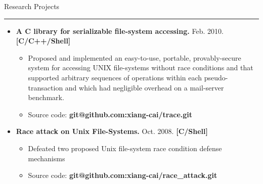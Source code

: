 \documentclass[11pt,oneside]{article}
\newenvironment{ressection}[1]{
	{\fontfamily{phv}\selectfont\Large#1}
	
	\vspace{-8pt} \rule{\textwidth}{.5pt}
	
	\vspace{-4pt}
	\begin{itemize}
	\vspace{.5pt}
}{
	\end{itemize}
}
\newcommand{\resitem}[1]{
	\vspace{2pt}
	\item \begin{flushleft} #1 \end{flushleft}
}
\begin{document}
\begin{ressection}{Research Projects}
	\vspace{-4pt}
	\resitem{\textbf{A C library for serializable file-system
				accessing.} Feb. 2010. \hfill\textbf{[C/C++/Shell]} 
		\vspace{-2pt}
		\begin{small}
		\vspace{-2pt}
		\begin{itemize}
		\item
		Proposed and implemented an
					easy-to-use, portable, provably-secure system for
					accessing UNIX file-systems without race conditions
					and that supported arbitrary sequences of operations
					within each pseudo-transaction and which had
					negligible overhead on a mail-server
					benchmark.
		\item					
		Source code: \textbf{git@github.com:xiang-cai/trace.git}
		\end{itemize}		
		\end{small}
	}
	
	\vspace{-4pt}
	\resitem{\textbf{Race attack on Unix File-Systems.} Oct. 2008. \hfill\textbf{[C/Shell]}
		\vspace{-2pt}
		\begin{small}
		\vspace{-2pt}
		\begin{itemize}
		\item		
		Defeated two proposed Unix file-system race
			condition defense mechanisms
		\item			
		Source code: \textbf{git@github.com:xiang-cai/race\_attack.git}
		\end{itemize}		
		\end{small}
	} 



\end{ressection}
\end{document}
